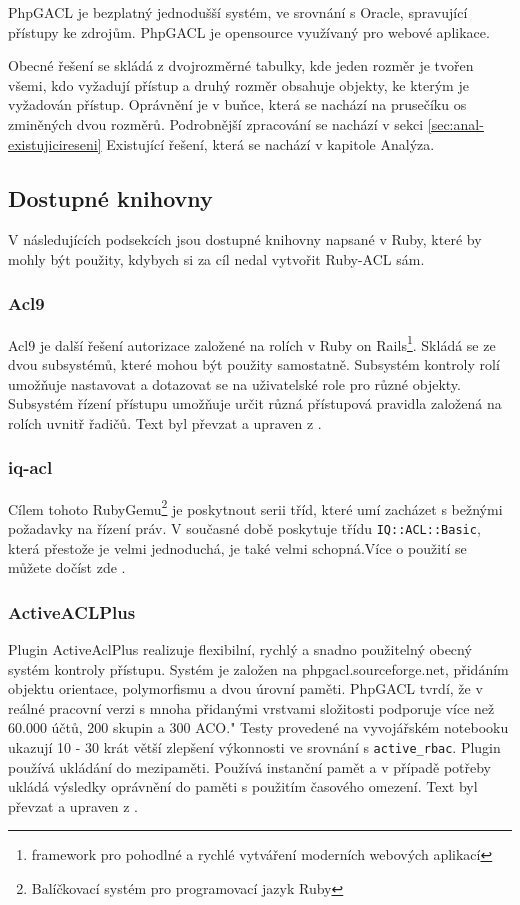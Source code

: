 PhpGACL je bezplatný jednodušší systém, ve srovnání s Oracle, spravující přístupy ke zdrojům. PhpGACL je opensource využívaný pro webové aplikace.

Obecné řešení se skládá z dvojrozměrné tabulky, kde jeden rozměr je tvořen všemi, kdo vyžadují přístup a druhý rozměr obsahuje objekty, ke kterým je vyžadován přístup. Oprávnění je v buňce, která se nachází na prusečíku os zminěných dvou rozměrů.
Podrobnější zpracování se nachází v sekci \ref{sec:anal-existujicireseni} Existující řešení, která se nachází v kapitole Analýza.

\subsection{Dostupné knihovny}
V následujících podsekcích jsou dostupné knihovny napsané v Ruby, které by mohly být použity, kdybych si za cíl nedal vytvořit Ruby-ACL sám.

\subsubsection{Acl9}
Acl9 je další řešení autorizace založené na rolích v Ruby on Rails\footnote{framework pro pohodlné a rychlé vytváření moderních webových aplikací}. Skládá se ze dvou subsystémů, které mohou být použity samostatně. Subsystém kontroly rolí umožňuje nastavovat a dotazovat se na uživatelské role pro různé objekty. 
Subsystém řízení přístupu umožňuje určit různá přístupová pravidla založená na rolích uvnitř řadičů. Text byl převzat a upraven z \cite{github:acl9}.

\subsubsection{iq-acl}
Cílem tohoto RubyGemu\footnote{Balíčkovací systém pro programovací jazyk Ruby} je poskytnout serii tříd, které umí zacházet s bežnými požadavky na řízení práv. V současné době poskytuje třídu \verb|IQ::ACL::Basic|, která přestože je velmi jednoduchá, je také velmi schopná.Více o použití se můžete dočíst zde \cite{github:iq-acl}.

\subsubsection{ActiveACLPlus}
Plugin ActiveAclPlus realizuje flexibilní, rychlý a snadno použitelný obecný systém kontroly přístupu.
Systém je založen na phpgacl.sourceforge.net, přidáním objektu orientace, polymorfismu a dvou úrovní paměti. PhpGACL tvrdí, že v reálné pracovní verzi s mnoha přidanými vrstvami složitosti podporuje více než 60.000 účtů, 200 skupin a 300 ACO." Testy provedené na vyvojářském notebooku ukazují 10 - 30 krát větší zlepšení výkonnosti ve srovnání s \verb|active_rbac|.
Plugin používá ukládání do mezipaměti. Používá instanční pamět a v případě potřeby ukládá výsledky oprávnění do paměti s použitím časového omezení. Text byl převzat a upraven z \cite{rubyforge:ActiveAclPlus}.